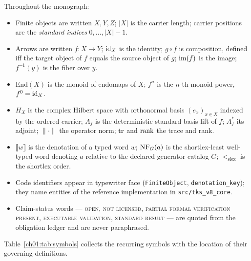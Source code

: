 \begin{notation}\label{ch01:not:conventions}
Throughout the monograph:
\begin{itemize}
\item Finite objects are written $X, Y, Z$; $|X|$ is the carrier length;
carrier positions are the \emph{standard indices} $0, \dots, |X|-1$.
\item Arrows are written $f : X \to Y$; $\mathrm{id}_X$ is the identity;
$g \circ f$ is composition, defined iff the target object of $f$ equals the
source object of $g$; $\mathrm{im}(f)$ is the image; $f^{-1}(y)$ is the fiber over
$y$.
\item $\mathrm{End}(X)$ is the monoid of endomaps of $X$; $f^n$ is the
$n$-th monoid power, $f^0 = \mathrm{id}_X$.
\item $H_X$ is the complex Hilbert space with orthonormal basis
$(e_x)_{x \in X}$ indexed by the ordered carrier; $A_f$ is the deterministic
standard-basis lift of $f$; $A_f^{*}$ its adjoint; $\lVert \cdot \rVert$
the operator norm; $\mathrm{tr}$ and $\mathrm{rank}$ the trace and rank.
\item $\llbracket w \rrbracket$ is the denotation of a typed word $w$;
$\mathrm{NF}_G(a)$ is the shortlex-least well-typed word denoting $a$ relative to
the declared generator catalog $G$; $<_{\mathrm{slex}}$ is the shortlex
order.
\item Code identifiers appear in typewriter face
(\texttt{FiniteObject}, \texttt{denotation\_key}); they name entities of the
reference implementation in \texttt{src/tks\_v8\_core}.
\item Claim-status words --- \textsc{open}, \textsc{not licensed},
\textsc{partial formal verification present}, \textsc{executable
validation}, \textsc{standard result} --- are quoted from the obligation
ledger and are never paraphrased.
\end{itemize}
\end{notation}

Table~\ref{ch01:tab:symbols} collects the recurring symbols with the
location of their governing definitions.

